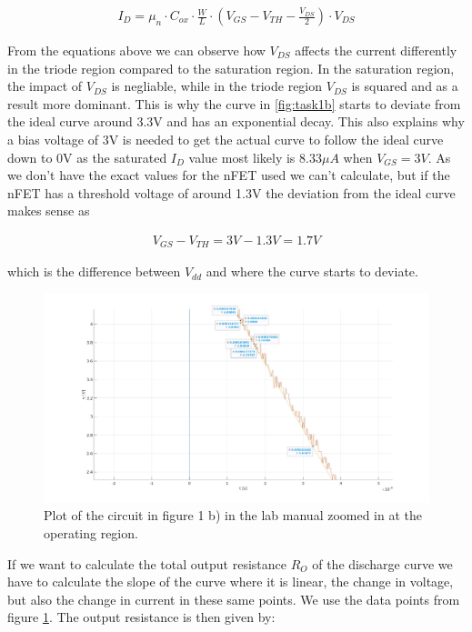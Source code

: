 \documentclass[onecolumn]{article}
\begin{document}
\begin{align}
    I_D = \mu_n \cdot C_{ox} \cdot \frac{W}{L} \cdot (V_{GS} - V_{TH} - \frac{V_{DS}}{2}) \cdot V_{DS}
\end{align}

From the equations above we can observe how $V_{DS}$ affects the current differently in the triode region compared to the saturation region. In the saturation region, the impact of $V_{DS}$ is negliable, while in the triode region $V_{DS}$ is squared and as a result more dominant. This is why the curve in \ref{fig:task1b} starts to deviate from the ideal curve around 3.3V and has an exponential decay. This also explains why a bias voltage of 3V is needed to get the actual curve to follow the ideal curve down to 0V as the saturated $I_D$ value most likely is $8.33\mu A$ when $V_{GS} = 3V$. 
As we don't have the exact values for the nFET used we can't calculate, but if the nFET has a threshold voltage of around 1.3V the deviation from the ideal curve makes sense as 

\begin{align}
    V_{GS} - V_{TH} = 3V - 1.3V = 1.7V
\end{align}

which is the difference between $V_{dd}$ and where the curve starts to deviate.
\clearpage

\begin{figure}
    \centering
    \includegraphics[width=1\textwidth]{1bb.jpg}
    \caption{Plot of the circuit in figure 1 b) in the lab manual zoomed in at the operating region.}
    \label{fig:task1bb}
\end{figure}

If we want to calculate the total output resistance $R_O$ of the discharge curve we have to calculate the slope of the curve where it is linear, the change in voltage, but also the change in current in these same points. We use the data points from figure \ref{fig:task1bb}. The output resistance is then given by: 
\end{document}
